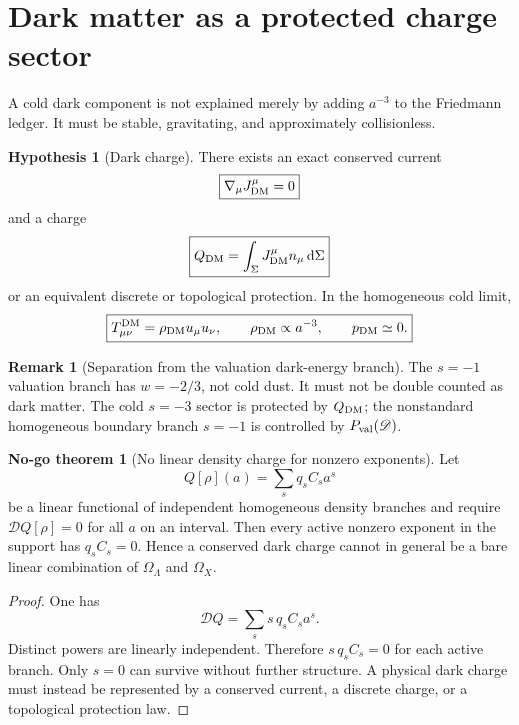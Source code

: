 \documentclass[aps,prd,reprint,nofootinbib,superscriptaddress]{revtex4-2}
\numberwithin{equation}{section}
\theoremstyle{definition}
\newtheorem{hypothesis}{Hypothesis}[section]
\newtheorem{remark}{Remark}[section]
\newtheorem{nogotheorem}{No-go theorem}[section]
\theoremstyle{plain}
\newcommand{\dd}{\mathrm d}
\newcommand{\Dil}{\mathscr D}
\begin{document}
\section{Dark matter as a protected charge sector}

A cold dark component is not explained merely by adding \(a^{-3}\) to the Friedmann ledger.  It must be stable, gravitating, and approximately collisionless.

\begin{hypothesis}[Dark charge]\label{hyp:dark-charge}
There exists an exact conserved current
\begin{equation}
\boxed{
\nabla_\mu J^\mu_{\rm DM}=0
}
\end{equation}
and a charge
\begin{equation}
\boxed{
Q_{\rm DM}=\int_\Sigma J^\mu_{\rm DM}n_\mu\,\dd\Sigma
}
\end{equation}
or an equivalent discrete or topological protection.  In the homogeneous cold limit,
\begin{equation}
\boxed{
T^{\rm DM}_{\mu\nu}=\rho_{\rm DM}u_\mu u_\nu,
\qquad
\rho_{\rm DM}\propto a^{-3},
\qquad
p_{\rm DM}\simeq0.
}
\end{equation}
\end{hypothesis}

\begin{remark}[Separation from the valuation dark-energy branch]
The \(s=-1\) valuation branch has \(w=-2/3\), not cold dust.  It must not be double counted as dark matter.  The cold \(s=-3\) sector is protected by \(Q_{\rm DM}\); the nonstandard homogeneous boundary branch \(s=-1\) is controlled by \(P_{\rm val}(\Dil)\).
\end{remark}


\begin{nogotheorem}[No linear density charge for nonzero exponents]\label{nogo:linear-density-charge}
Let
\[
Q[\rho](a)=\sum_s q_sC_sa^s
\]
be a linear functional of independent homogeneous density branches and require \(\Dil Q[\rho]=0\) for all \(a\) on an interval.  Then every active nonzero exponent in the support has \(q_sC_s=0\).  Hence a conserved dark charge cannot in general be a bare linear combination of \(\Omega_\Lambda\) and \(\Omega_X\).
\end{nogotheorem}

\begin{proof}
One has
\[
\Dil Q=\sum_s s\,q_sC_sa^s.
\]
Distinct powers are linearly independent.  Therefore \(s\,q_sC_s=0\) for each active branch.  Only \(s=0\) can survive without further structure.  A physical dark charge must instead be represented by a conserved current, a discrete charge, or a topological protection law.
\end{proof}
\end{document}
